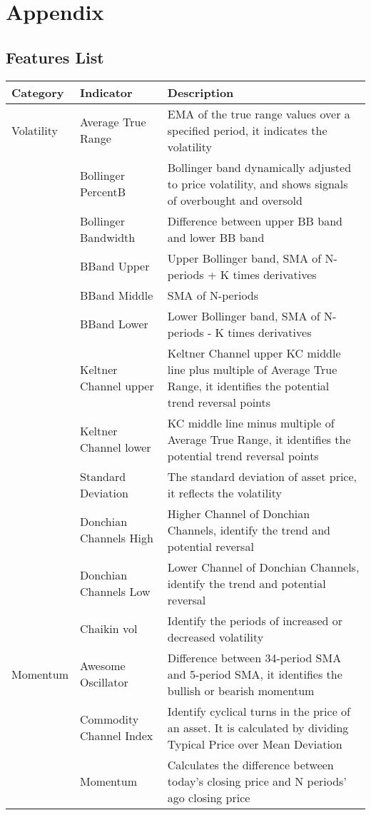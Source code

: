\documentclass{article}
\begin{document}
\newpage
\section{Appendix}
\subsection{Features List}

\begin{table}[H]
\centering
\begin{tabular}{|p{2cm}|p{4cm}|p{6cm}|}
\hline
\textbf{Category} & \textbf{Indicator} & {Description}\\
\hline
Volatility & Average True Range & EMA of the true range values over a specified period, it indicates the volatility \\
\hline
 {} & Bollinger PercentB & Bollinger band dynamically adjusted to price volatility, and shows signals of overbought and oversold \\
\hline
{} & Bollinger Bandwidth & Difference between upper BB band and lower BB band \\
\hline
{} & BBand Upper & Upper Bollinger band, SMA of N-periods + K times derivatives \\
\hline
{} & BBand Middle & SMA of N-periods \\
\hline
{} & BBand Lower & Lower Bollinger band, SMA of N-periods - K times derivatives \\
\hline
{} & Keltner Channel upper & Keltner Channel upper
KC middle line plus multiple of Average True Range, it identifies the potential trend reversal points \\
\hline
{} & Keltner Channel lower & KC middle line minus multiple of Average True Range, it identifies the potential trend reversal points \\
\hline
{} & Standard Deviation & The standard deviation of asset price, it reflects the volatility \\
\hline
{} & Donchian Channels High & Higher Channel of Donchian Channels, identify the trend and potential reversal \\
\hline
{} & Donchian Channels Low & Lower Channel of Donchian Channels, identify the trend and potential reversal \\
\hline
{} & Chaikin vol & Identify the periods of increased or decreased volatility \\
\hline
Momentum & Awesome Oscillator & Difference between 34-period SMA and 5-period SMA, it identifies the bullish or bearish momentum \\
\hline
{} & Commodity Channel Index & Identify cyclical turns in the price of an asset. It is calculated by dividing Typical Price over Mean Deviation \\
\hline
{} & Momentum & Calculates the difference between today’s closing price and N periods’ ago closing price \\
\hline
\end{tabular}
\end{table}
\end{document}
